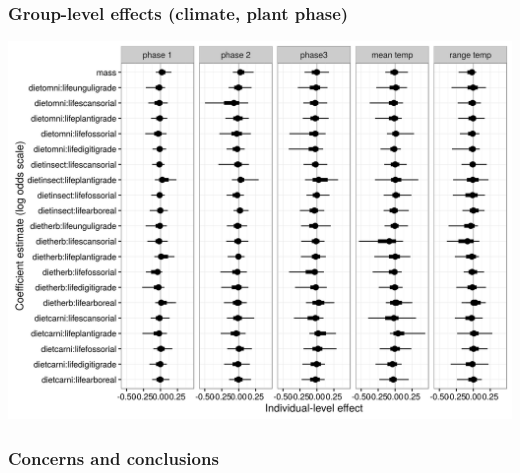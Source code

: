 \documentclass{beamer}
\begin{document}
\begin{frame}
  \frametitle{Group-level effects (climate, plant phase)}

  \begin{center}
    \includegraphics[height=0.8\textheight,width=\textwidth,keepaspectratio=true]{figure/gamma_est_full}
  \end{center}
\end{frame}

\begin{frame}
  \frametitle{Concerns and conclusions}
\end{frame}
\end{document}
